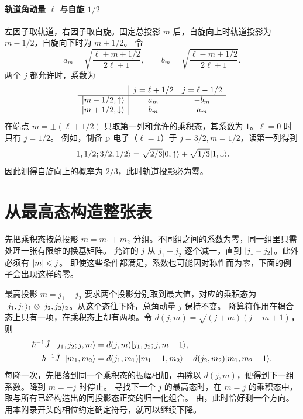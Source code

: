 \paragraph*{轨道角动量 $\ell$ 与自旋 $1/2$}
左因子取轨道，右因子取自旋。固定总投影 $m$ 后，自旋向上时轨道投影为 $m - 1/2$，自旋向下时为 $m + 1/2$。
令
\begin{equation}
    a_m = \sqrt{\frac{\ell + m + 1/2}{2\ell + 1}},\qquad
    b_m = \sqrt{\frac{\ell - m + 1/2}{2\ell + 1}}.
\end{equation}
两个 $j$ 都允许时，系数为
\begin{equation}
    \begin{array}{c|cc}
        & j = \ell + 1/2 & j = \ell - 1/2 \\ \hline
        \lvert m - 1/2,\mathord{\uparrow}\rangle & a_m & -b_m \\
        \lvert m + 1/2,\mathord{\downarrow}\rangle & b_m & a_m
    \end{array}
\end{equation}
在端点 $m = \pm(\ell + 1/2)$ 只取第一列和允许的乘积态，其系数为 $1$。$\ell = 0$ 时只有 $j = 1/2$。
例如，制备 $\mathrm{p}$ 电子（$\ell = 1$）于 $j = 3/2,m = 1/2$，读第一列得到
\begin{equation}
    \lvert1,1/2;3/2,1/2\rangle
    = \sqrt{2/3}\lvert0,\mathord{\uparrow}\rangle + \sqrt{1/3}\lvert1,\mathord{\downarrow}\rangle.
\end{equation}
因此测得自旋向上的概率为 $2/3$，此时轨道投影必为零。

\section{从最高态构造整张表}
\label{sec:cg-lowering}
先把乘积态按总投影 $m = m_1 + m_2$ 分组。不同组之间的系数为零，同一组里只需处理一张有限维的换基矩阵。
允许的 $j$ 从 $j_1 + j_2$ 逐个减一，直到 $\lvert j_1 - j_2\rvert$。此外必须有 $\lvert m\rvert \leqslant j$。
即使这些条件都满足，系数也可能因对称性而为零，下面的例子会出现这样的零。

最高投影 $m = j_1 + j_2$ 要求两个投影分别取到最大值，对应的乘积态为 $\lvert j_1,j_1\rangle_1 \otimes \lvert j_2,j_2\rangle_2$。从这个态往下降，总角动量 $j$ 保持不变。
降算符作用在耦合态上只有一项，在乘积态上却有两项。令 $d(j,m) = \sqrt{(j + m)(j - m + 1)}$，则
\begin{equation}
    \begin{alignedat}{1}
        \hbar^{-1}\hat{J}_-\lvert j_1,j_2;j,m\rangle
            &= d(j,m)\lvert j_1,j_2;j,m - 1\rangle,\\
        \hbar^{-1}\hat{J}_-\lvert m_1,m_2\rangle
            &= d(j_1,m_1)\lvert m_1 - 1,m_2\rangle + d(j_2,m_2)\lvert m_1,m_2 - 1\rangle.
    \end{alignedat}
\end{equation}
每降一次，先把落到同一个乘积态的振幅相加，再除以 $d(j,m)$，便得到下一组系数。降到 $m = -j$ 时停止。
寻找下一个 $j$ 的最高态时，在 $m = j$ 的乘积态中，取与所有已经构造出的同投影态正交的归一化组合。
由，此时恰好剩一个方向。用本附录开头的相位约定确定符号，就可以继续下降。

